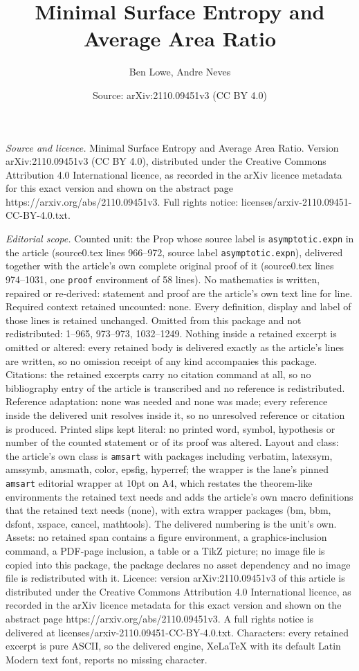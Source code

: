 \documentclass[10pt,a4paper]{amsart}
\title[Minimal Surface Entropy and Average Area Ratio]{Minimal Surface Entropy and Average Area Ratio}
\author{Ben Lowe, Andre Neves}
\date{Source: arXiv:2110.09451v3 (CC BY 4.0)}
\begin{document}
\maketitle

\noindent\emph{Source and licence.} Minimal Surface Entropy and Average Area Ratio. Version arXiv:2110.09451v3 (CC BY 4.0), distributed under the Creative Commons Attribution 4.0 International licence, as recorded in the arXiv licence metadata for this exact version and shown on the abstract page https://arxiv.org/abs/2110.09451v3. Full rights notice: licenses/arxiv-2110.09451-CC-BY-4.0.txt.\par\smallskip

\noindent\textit{Editorial scope.} Counted unit: the Prop whose source label is \texttt{asymptotic.expn} in the article (source0.tex lines 966--972, source label \texttt{asymptotic.expn}), delivered together with the article's own complete original proof of it (source0.tex lines 974--1031, one \texttt{proof} environment of 58 lines). No mathematics is written, repaired or re-derived: statement and proof are the article's own text line for line. Required context retained uncounted: none. Every definition, display and label of those lines is retained unchanged. Omitted from this package and not redistributed: 1--965, 973--973, 1032--1249. Nothing inside a retained excerpt is omitted or altered: every retained body is delivered exactly as the article's lines are written, so no omission receipt of any kind accompanies this package. Citations: the retained excerpts carry no citation command at all, so no bibliography entry of the article is transcribed and no reference is redistributed. Reference adaptation: none was needed and none was made; every reference inside the delivered unit resolves inside it, so no unresolved reference or citation is produced. Printed slips kept literal: no printed word, symbol, hypothesis or number of the counted statement or of its proof was altered. Layout and class: the article's own class is \texttt{amsart} with packages including verbatim, latexsym, amssymb, amsmath, color, epsfig, hyperref; the wrapper is the lane's pinned \texttt{amsart} editorial wrapper at 10pt on A4, which restates the theorem-like environments the retained text needs and adds the article's own macro definitions that the retained text needs (none), with extra wrapper packages (bm, bbm, dsfont, xspace, cancel, mathtools). The delivered numbering is the unit's own. Assets: no retained span contains a figure environment, a graphics-inclusion command, a PDF-page inclusion, a table or a TikZ picture; no image file is copied into this package, the package declares no asset dependency and no image file is redistributed with it. Licence: version arXiv:2110.09451v3 of this article is distributed under the Creative Commons Attribution 4.0 International licence, as recorded in the arXiv licence metadata for this exact version and shown on the abstract page https://arxiv.org/abs/2110.09451v3. A full rights notice is delivered at licenses/arxiv-2110.09451-CC-BY-4.0.txt. Characters: every retained excerpt is pure ASCII, so the delivered engine, XeLaTeX with its default Latin Modern text font, reports no missing character.
\end{document}
